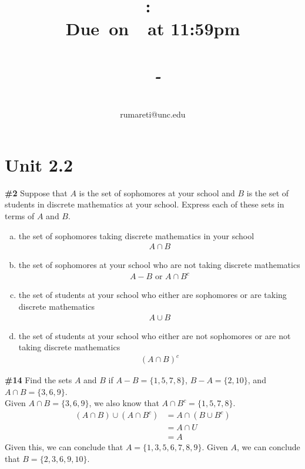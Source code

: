 \documentclass{article}
\title{
    \vspace{2in}
    \textmd{\textbf{\hmwkClass:\ \hmwkTitle}}\\
    \normalsize\vspace{0.1in}\small{\textbf{Due\ on\ \hmwkDueDate\ at 11:59pm}}\\
    \normalsize\text{Tuesday/Thursday 11:00-12:15, Phillips 383}\\
    \vspace{0.1in}\large{\textit{\hmwkClassInstructor\ - \hmwkClassTime}}
    \vspace{3in}
}
\author{\hmwkAuthorName\\\small{rumareti@unc.edu}}
\date{}
\newcommand{\unit}[1]{\section{Unit #1}}
\newcommand{\problem}[1]{\textbf{\##1}}
\newcommand{\prob}[1]{\problem{#1}}
\newcommand{\intersection}{\cap}
\newcommand{\union}{\cup}
\begin{document}
\maketitle

\pagebreak

\unit{2.2}
\prob{2}
Suppose that \(A\) is the set of sophomores at your school and \(B\) is the set of students in discrete mathematics at your school. Express each of these sets in terms of \(A\)
and \(B\).
\begin{enumerate}[a)]
    \item the set of sophomores taking discrete mathematics in
    your school
    \begin{align*}
        A \intersection B
    \end{align*}
    \item the set of sophomores at your school who are not taking discrete mathematics
    \begin{align*}
        A - B \text{ or } A \intersection B^{c}
    \end{align*}
    \item the set of students at your school who either are sophomores or are taking discrete mathematics
    \begin{align*}
        A \union B
    \end{align*}
    \item the set of students at your school who either are not sophomores or are not taking discrete mathematics
    \begin{align*}
        (A \intersection B)^{c}
    \end{align*}
\end{enumerate}

\pagebreak
\prob{14}
Find the sets \(A\) and \(B\) if \(A - B = \{1, 5, 7, 8\}\), \(B - A = \{2, 10\}\), and \(A \intersection B = \{3, 6, 9\}\).\\

Given \(A \intersection B = \{3, 6, 9\}\), we also know that \(A \intersection B^{c} = \{1,5,7,8\}\).\\
\begin{align*}
    (A \intersection B) \union (A \intersection B^{c}) &= A \intersection (B \union B^{c})\\
    &= A \intersection U\\
    &= A
\end{align*}
Given this, we can conclude that \(A = \{1,3,5,6,7,8,9\}\). Given \(A\), we can conclude that \(B = \{2,3,6,9,10\}\).
\end{document}
